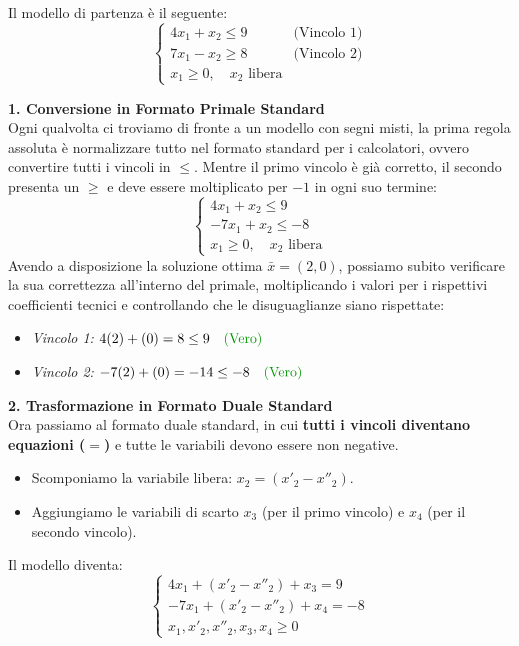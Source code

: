 \documentclass[12pt, a4paper]{article}
\begin{document}
	Il modello di partenza è il seguente:
	\[
	\begin{cases}
		4x_1 + x_2 \leq 9 \quad &\text{(Vincolo 1)} \\
		7x_1 - x_2 \geq 8 \quad &\text{(Vincolo 2)} \\
		x_1 \geq 0, \quad x_2 \text{ libera}
	\end{cases}
	\]
	
	\textbf{1. Conversione in Formato Primale Standard}\\
	Ogni qualvolta ci troviamo di fronte a un modello con segni misti, la prima regola assoluta è normalizzare tutto nel formato standard per i calcolatori, ovvero convertire tutti i vincoli in $\leq$.
	Mentre il primo vincolo è già corretto, il secondo presenta un $\geq$ e deve essere moltiplicato per $-1$ in ogni suo termine:
	\[
	\begin{cases}
		4x_1 + x_2 \leq 9 \\
		-7x_1 + x_2 \leq -8 \\
		x_1 \geq 0, \quad x_2 \text{ libera}
	\end{cases}
	\]
	Avendo a disposizione la soluzione ottima $\bar{x} = (2, 0)$, possiamo subito verificare la sua correttezza all'interno del primale, moltiplicando i valori per i rispettivi coefficienti tecnici e controllando che le disuguaglianze siano rispettate:
	\begin{itemize}[label=\textcolor{titlecolor}{\Large\textbullet}, itemsep=2pt, leftmargin=1.5cm]
		\item \textit{Vincolo 1:} $4(2) + (0) = 8 \leq 9 \quad \text{\textcolor{green!60!black}{(Vero)}}$
		\item \textit{Vincolo 2:} $-7(2) + (0) = -14 \leq -8 \quad \text{\textcolor{green!60!black}{(Vero)}}$
	\end{itemize}
	
	\vspace{0.4cm}
	\textbf{2. Trasformazione in Formato Duale Standard}\\
	Ora passiamo al formato duale standard, in cui \textbf{tutti i vincoli diventano equazioni ($=$)} e tutte le variabili devono essere non negative.
	\begin{itemize}
		\item Scomponiamo la variabile libera: $x_2 = (x'_2 - x''_2)$.
		\item Aggiungiamo le variabili di scarto $x_3$ (per il primo vincolo) e $x_4$ (per il secondo vincolo).
	\end{itemize}
	Il modello diventa:
	\[
	\begin{cases}
		4x_1 + (x'_2 - x''_2) + x_3 = 9 \\
		-7x_1 + (x'_2 - x''_2) + x_4 = -8 \\
		x_1, x'_2, x''_2, x_3, x_4 \geq 0
	\end{cases}
	\]
	
\end{document}
